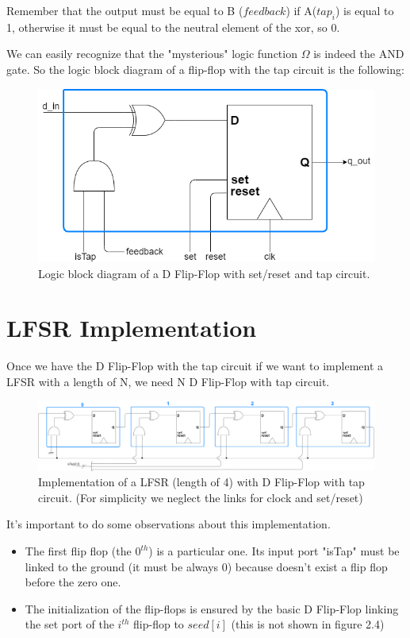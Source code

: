 \documentclass[a4paper]{report}
\begin{document}
\noindent Remember that the output must be equal to B ($feedback$) if A($tap_i$) is equal to 1, otherwise it must be equal to the neutral element of the xor, so 0.

\noindent We can easily recognize that the "mysterious" logic function $\Omega$ is indeed the AND gate.
So the logic block diagram of a flip-flop with the tap circuit is the following:
\begin{figure}[htpb]
	\centering
	\includegraphics[scale=0.6]{img/FF_tap_circuit.png}
	\caption{Logic block diagram of a D Flip-Flop with set/reset and tap circuit.}
\end{figure}

\section{LFSR Implementation}
Once we have the D Flip-Flop with the tap circuit if we want to implement a LFSR with a length of N, we need N D Flip-Flop with tap circuit.
\begin{figure}[htpb]
	\centering
	\includegraphics[scale=0.19]{img/LFSR_logic_block.png}
	\caption{Implementation of a LFSR (length of 4) with D Flip-Flop with tap circuit. (For simplicity we neglect the links for clock and set/reset)}
\end{figure}

\noindent It's important to do some observations about this implementation.
\begin{itemize}
	\item The first flip flop (the $0^{th}$) is a particular one. Its input port "isTap" must be linked to the ground (it must be always 0) because doesn't exist a flip flop before the zero one.
	\item The initialization of the flip-flops is ensured by the basic D Flip-Flop linking the set port of the $i^{th}$ flip-flop to $seed[i]$ (this is not shown in figure 2.4)
\end{itemize}
\end{document}
